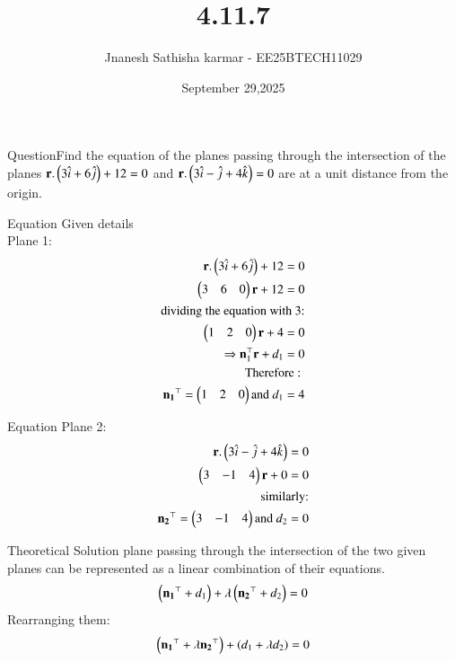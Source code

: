 \documentclass{beamer}
\title %
{4.11.7}
\date{September 29,2025}
\author 
{Jnanesh Sathisha karmar - EE25BTECH11029}
\begin{document}
\frame{\titlepage}
\begin{frame}{Question}Find the equation of the planes passing through the intersection of the planes $\mathbf{r}.\left(3\hat{i}+6\hat{j}\right)+12=0$ and $\mathbf{r}.\left(3\hat{i}-\hat{j}+4\hat{k}\right)=0$ are at a unit distance from the origin.


\end{frame}



\begin{frame}{Equation}
Given details\\Plane 1:
\begin{align}
   \mathbf{r}.\left(3\hat{i}+6\hat{j}\right)+12=0\\
   \begin{pmatrix}3&6&0\end{pmatrix}\mathbf{r}+12=0\\
   \text{dividing the equation with 3:}\\
   \begin{pmatrix}1&2&0\end{pmatrix}\mathbf{r}+4=0\\
   \Rightarrow \mathbf{n}_1^{\top}\mathbf{r}+d_1=0\\
   \text{Therefore :      }\\ \mathbf{n_1}^{\top}=\begin{pmatrix}1 & 2 &0\end{pmatrix} \text{and}\  d_1=4
\end{align}
\end{frame}
\begin{frame}{Equation}
Plane 2:
\begin{align}
    \mathbf{r}.\left(3\hat{i}-\hat{j}+4\hat{k}\right)=0\\
    \begin{pmatrix}3 & -1 & 4\end{pmatrix}\mathbf{r}+0=0\\
    \text{similarly:}\\
    \mathbf{n_2}^{\top}=\begin{pmatrix}3 & -1 & 4\end{pmatrix} \text{and}\ d_2=0
\end{align}
\end{frame}
\begin{frame}{Theoretical Solution}
plane passing through the intersection of the two given planes can be represented as a linear combination of their equations.
\begin{align}
    \left(\mathbf{n_1}^{\top}+d_1\right)+\lambda\left(\mathbf{n_2}^{\top}+d_2\right)=0
\end{align}
Rearranging them:
\begin{align}
    \left(\mathbf{n_1}^{\top}+\lambda\mathbf{n_2}^{\top}\right)+\left(d_1+ \lambda d_2\right)=0
\end{align}
\end{frame}
\end{document}
